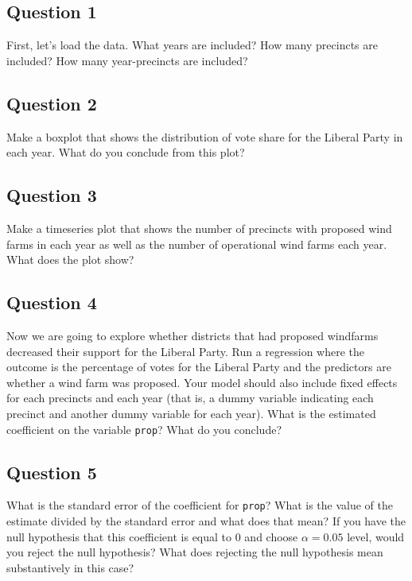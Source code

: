 \documentclass[]{article}
\begin{document}
\subsection{Question 1}\label{question-1}

First, let's load the data. What years are included? How many precincts
are included? How many year-precincts are included?

\subsection{Question 2}\label{question-2}

Make a boxplot that shows the distribution of vote share for the Liberal
Party in each year. What do you conclude from this plot?

\subsection{Question 3}\label{question-3}

Make a timeseries plot that shows the number of precincts with proposed
wind farms in each year as well as the number of operational wind farms
each year. What does the plot show?

\subsection{Question 4}\label{question-4}

Now we are going to explore whether districts that had proposed
windfarms decreased their support for the Liberal Party. Run a
regression where the outcome is the percentage of votes for the Liberal
Party and the predictors are whether a wind farm was proposed. Your
model should also include fixed effects for each precincts and each year
(that is, a dummy variable indicating each precinct and another dummy
variable for each year). What is the estimated coefficient on the
variable \texttt{prop}? What do you conclude?

\subsection{Question 5}\label{question-5}

What is the standard error of the coefficient for \texttt{prop}? What is
the value of the estimate divided by the standard error and what does
that mean? If you have the null hypothesis that this coefficient is
equal to 0 and choose $\alpha = 0.05$ level, would you reject the null
hypothesis? What does rejecting the null hypothesis mean substantively
in this case?
\end{document}
